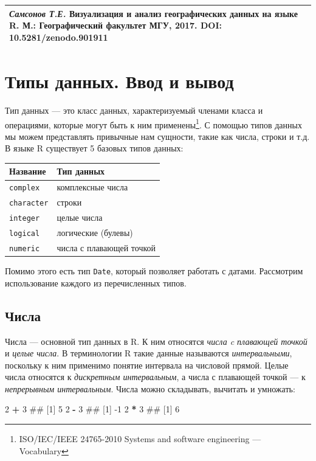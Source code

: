 \documentclass[]{book}
\newenvironment{Shaded}{\begin{snugshade}}{\end{snugshade}}
\newcommand{\DecValTok}[1]{\textcolor[rgb]{0.00,0.00,0.81}{#1}}
\newcommand{\StringTok}[1]{\textcolor[rgb]{0.31,0.60,0.02}{#1}}
\newcommand{\OperatorTok}[1]{\textcolor[rgb]{0.81,0.36,0.00}{\textbf{#1}}}
\newcommand{\NormalTok}[1]{#1}
\let\rmarkdownfootnote\footnote%
\def\footnote{\protect\rmarkdownfootnote}
\begin{document}
\begin{longtable}[]{@{}l@{}}
\toprule
\emph{Самсонов Т.Е.} \textbf{Визуализация и анализ географических данных
на языке R.} М.: Географический факультет МГУ, 2017. DOI:
10.5281/zenodo.901911\tabularnewline
\bottomrule
\end{longtable}

\chapter{Типы данных. Ввод и вывод}\label{data_types}

Тип данных --- это класс данных, характеризуемый членами класса и
операциями, которые могут быть к ним применены\footnote{ISO/IEC/IEEE
  24765-2010 Systems and software engineering --- Vocabulary}. С помощью
типов данных мы можем представлять привычные нам сущности, такие как
числа, строки и т.д. В языке R существует 5 базовых типов данных:

\begin{longtable}[]{@{}ll@{}}
\toprule
Название & Тип данных\tabularnewline
\midrule
\endhead
\texttt{complex} & комплексные числа\tabularnewline
\texttt{character} & строки\tabularnewline
\texttt{integer} & целые числа\tabularnewline
\texttt{logical} & логические (булевы)\tabularnewline
\texttt{numeric} & числа с плавающей точкой\tabularnewline
\bottomrule
\end{longtable}

Помимо этого есть тип \texttt{Date}, который позволяет работать с
датами. Рассмотрим использование каждого из перечисленных типов.

\section{Числа}\label{numbers}

Числа --- основной тип данных в R. К ним относятся \emph{числа c
плавающей точкой} и \emph{целые числа}. В терминологии R такие данные
называются \emph{интервальными}, поскольку к ним применимо понятие
интервала на числовой прямой. Целые числа относятся к \emph{дискретным
интервальным}, а числа с плавающей точкой --- к \emph{непрерывным
интервальным}. Числа можно складывать, вычитать и умножать:

\begin{Shaded}
\begin{Highlighting}[]
\DecValTok{2} \OperatorTok{+}\StringTok{ }\DecValTok{3}
\NormalTok{## [1] 5}
\DecValTok{2} \OperatorTok{-}\StringTok{ }\DecValTok{3}
\NormalTok{## [1] -1}
\DecValTok{2} \OperatorTok{*}\StringTok{ }\DecValTok{3}
\NormalTok{## [1] 6}
\end{Highlighting}
\end{Shaded}
\end{document}
